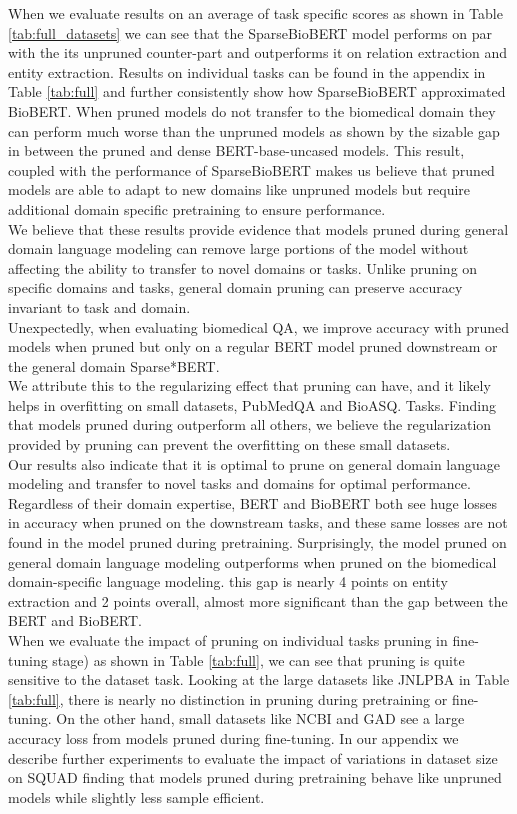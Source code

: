 When we evaluate results on an average of task specific scores as shown in Table \ref{tab:full_datasets} we can see that the SparseBioBERT model performs on par with the its unpruned counter-part and outperforms it on relation extraction and entity extraction. Results on individual tasks can be found in the appendix in Table \ref{tab:full} and further consistently show how SparseBioBERT approximated BioBERT. When pruned models do not transfer to the biomedical domain they can perform much worse than the unpruned models as shown by the sizable gap in between the pruned and dense BERT-base-uncased models. This result, coupled with the performance of SparseBioBERT makes us believe that pruned models are able to adapt to new domains like unpruned models but require additional domain specific pretraining to ensure performance. \\
We believe that these results provide evidence that models pruned during general domain language modeling can remove large portions of the model without affecting the ability to transfer to novel domains or tasks. Unlike pruning on specific domains and tasks, general domain pruning can preserve accuracy invariant to task and domain. \\
Unexpectedly, when evaluating biomedical QA, we improve accuracy with pruned models when pruned but only on a regular BERT model pruned downstream or the general domain Sparse*BERT. \\ We attribute this to the regularizing effect that pruning can have, and it likely helps in overfitting on small datasets, PubMedQA and BioASQ. Tasks. Finding that models pruned during outperform all others, we believe the regularization provided by pruning can prevent the overfitting on these small datasets.  \\
Our results also indicate that it is optimal to prune on general domain language modeling and transfer to novel tasks and domains for optimal performance. Regardless of their domain expertise, BERT and BioBERT both see huge losses in accuracy when pruned on the downstream tasks, and these same losses are not found in the model pruned during pretraining. Surprisingly, the model pruned on general domain language modeling outperforms when pruned on the biomedical domain-specific language modeling. this gap is nearly 4 points on entity extraction and 2 points overall, almost more significant than the gap between the BERT and BioBERT. \\
When we evaluate the impact of pruning on individual tasks pruning in fine-tuning stage) as shown in Table \ref{tab:full}, we can see that pruning is quite sensitive to the dataset task. Looking at the large datasets like JNLPBA in Table \ref{tab:full}, there is nearly no distinction in pruning during pretraining or fine-tuning. On the other hand, small datasets like NCBI and GAD see a large accuracy loss from models pruned during fine-tuning. In our appendix we describe further experiments to evaluate the impact of variations in dataset size on SQUAD \cite{Rajpurkar2016SQuAD1Q} finding that models pruned during pretraining behave like unpruned models while slightly less sample efficient.\\
